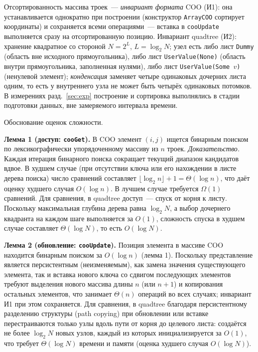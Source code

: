 \documentclass[a4paper]{article}
\begin{document}
Отсортированность массива троек~--- \emph{инвариант формата} COO (И1): она устанавливается однократно при построении (конструктор \texttt{ArrayCOO} сортирует координаты) и сохраняется всеми операциями~--- вставка в \texttt{cooUpdate} выполняется сразу на отсортированную позицию. Инвариант quadtree (И2): хранение квадратное со стороной $N=2^{L}$, $L=\log_2 N$; узел есть либо лист \texttt{Dummy} (область вне исходного прямоугольника), либо лист \texttt{UserValue(None)} (область внутри прямоугольника, заполненная нулями), либо лист \texttt{UserValue(Some~$v$)} (ненулевой элемент); \emph{конденсация} заменяет четыре одинаковых дочерних листа одним, то есть у внутреннего узла не может быть четырёх одинаковых потомков. В измерениях разд.~\ref{sec:exp} построение и сортировка выполнялись в стадии подготовки данных, вне замеряемого интервала времени.

Обоснование оценок сложности.

\textbf{Лемма 1 (доступ: \texttt{cooGet}).}
В COO элемент $(i,j)$ ищется бинарным поиском по лексикографически упорядоченному массиву из $n$ троек.
\textit{Доказательство.} Каждая итерация бинарного поиска сокращает текущий диапазон кандидатов вдвое. В худшем случае (при отсутствии ключа или его нахождении в листе дерева поиска) число сравнений составляет $\lfloor \log_2 n \rfloor + 1 = \Theta(\log n)$, что даёт оценку худшего случая $O(\log n)$. В лучшем случае требуется $\Omega(1)$ сравнений.
Для сравнения, в quadtree доступ~--- спуск от корня к листу. Поскольку максимальная глубина дерева равна $\log_2 N$, а выбор дочернего квадранта на каждом шаге выполняется за $O(1)$, сложность спуска в худшем случае составляет $\Theta(\log N)$, то есть $O(\log N)$.

\textbf{Лемма 2 (обновление: \texttt{cooUpdate}).}
Позиция элемента в массиве COO находится бинарным поиском за $O(\log n)$ (лемма 1). Поскольку представление является персистентным (неизменяемым), как замена значения существующего элемента, так и вставка нового ключа со сдвигом последующих элементов требуют выделения нового массива длины $n$ (или $n+1$) и копирования остальных элементов, что занимает $\Theta(n)$ операций во всех случаях; инвариант И1 при этом сохраняется.
Для сравнения, в quadtree благодаря персистентному разделению структуры (path copying) при обновлении или вставке перестраиваются только узлы вдоль пути от корня до целевого листа: создаётся не более $\log_2 N$ новых узлов, каждый из которых инициализируется за $O(1)$, что требует $\Theta(\log N)$ времени и памяти (оценка худшего случая $O(\log N)$).
\end{document}
